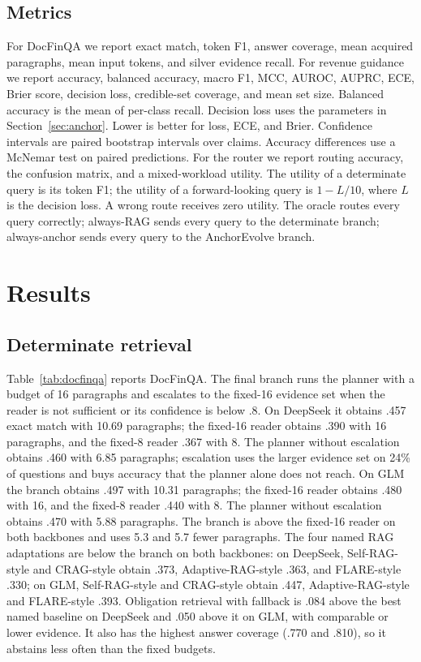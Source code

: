 \documentclass[11pt]{article}
\begin{document}
\subsection{Metrics}
\label{sec:metrics}
For DocFinQA we report exact match, token F1, answer coverage, mean acquired paragraphs, mean input tokens, and silver evidence recall. For revenue guidance we report accuracy, balanced accuracy, macro F1, MCC, AUROC, AUPRC, ECE, Brier score, decision loss, credible-set coverage, and mean set size. Balanced accuracy is the mean of per-class recall. Decision loss uses the parameters in Section~\ref{sec:anchor}. Lower is better for loss, ECE, and Brier. Confidence intervals are paired bootstrap intervals over claims. Accuracy differences use a McNemar test on paired predictions. For the router we report routing accuracy, the confusion matrix, and a mixed-workload utility. The utility of a determinate query is its token F1; the utility of a forward-looking query is $1-L/10$, where $L$ is the decision loss. A wrong route receives zero utility. The oracle routes every query correctly; always-RAG sends every query to the determinate branch; always-anchor sends every query to the AnchorEvolve branch.

\section{Results}
\label{sec:results}

\subsection{Determinate retrieval}
Table~\ref{tab:docfinqa} reports DocFinQA. The final branch runs the planner with a budget of 16 paragraphs and escalates to the fixed-16 evidence set when the reader is not sufficient or its confidence is below .8. On DeepSeek it obtains .457 exact match with 10.69 paragraphs; the fixed-16 reader obtains .390 with 16 paragraphs, and the fixed-8 reader .367 with 8. The planner without escalation obtains .460 with 6.85 paragraphs; escalation uses the larger evidence set on 24\% of questions and buys accuracy that the planner alone does not reach. On GLM the branch obtains .497 with 10.31 paragraphs; the fixed-16 reader obtains .480 with 16, and the fixed-8 reader .440 with 8. The planner without escalation obtains .470 with 5.88 paragraphs. The branch is above the fixed-16 reader on both backbones and uses 5.3 and 5.7 fewer paragraphs. The four named RAG adaptations are below the branch on both backbones: on DeepSeek, Self-RAG-style and CRAG-style obtain .373, Adaptive-RAG-style .363, and FLARE-style .330; on GLM, Self-RAG-style and CRAG-style obtain .447, Adaptive-RAG-style and FLARE-style .393. Obligation retrieval with fallback is .084 above the best named baseline on DeepSeek and .050 above it on GLM, with comparable or lower evidence. It also has the highest answer coverage (.770 and .810), so it abstains less often than the fixed budgets.
\end{document}
